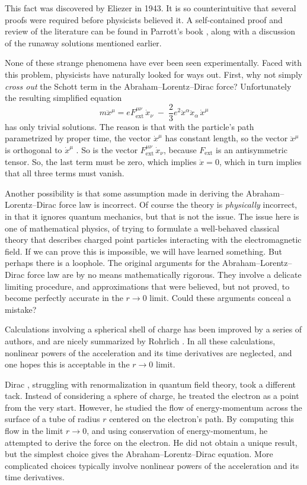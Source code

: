 \documentclass{article}
\newcommand{\ext}{\mathrm{ext}}
\begin{document}
This fact was discovered by Eliezer \cite{Eliezer} in 1943.  It is so counterintuitive that several proofs were required before physicists believed it.  A self-contained proof and review of the literature can be found in Parrott's book \cite{Parrott}, along with a discussion of the runaway solutions mentioned earlier.

None of these strange phenomena have ever been seen experimentally.  Faced with this
problem, physicists have naturally looked for ways out.   First, why not simply \emph{cross out} the Schott term in the Abraham--Lorentz--Dirac 
force?  Unfortunately the resulting simplified equation
\[    m \ddot{x}^\mu = e F_{\ext}^{\mu \nu} \, \dot{x}_\nu   \;- \;
\frac{2}{3}e^2 \ddot{x}^\alpha \ddot{x}_\alpha \, \dot{x}^\mu \]
has only trivial solutions.  The reason is that with the particle's path parametrized by 
proper time, the vector $\dot{x}^\mu$ has constant length, so the vector $\ddot{x}^\mu$ is orthogonal to $\dot{x}^\mu$ .  So is the vector 
$F_{\ext}^{\mu \nu} \, \dot{x}_\nu$, because $F_{\ext}$ is an antisymmetric
tensor.  So, the last term must be zero, which implies $\ddot{x} = 0$, 
which in turn implies that all three terms must vanish.
 
Another possibility is that some assumption made in deriving the Abraham--Lorentz--Dirac force law is incorrect.  Of course the theory is \emph{physically} incorrect, in that it ignores quantum mechanics, but that is not the issue.  The issue here is one of mathematical physics, of trying to formulate a well-behaved classical theory that describes charged point particles interacting with the electromagnetic field.  If we can prove this is impossible, we will have learned something.  But perhaps there is a loophole. The original arguments for the Abraham--Lorentz--Dirac force law are by no means mathematically rigorous.  They involve a delicate limiting procedure, and 
approximations that were believed, but not proved, to become perfectly accurate 
in the $r \to 0$ limit.  Could these arguments conceal a mistake?  

Calculations involving a spherical shell of charge has been improved by a series of 
authors, and are nicely summarized by Rohrlich \cite{Rohrlich1997,Rohrlich1999}. 
In all these calculations, nonlinear powers of the acceleration and its time derivatives
are neglected, and one hopes this is acceptable in the $r \to 0$ limit.   

Dirac \cite{Dirac}, struggling with renormalization in quantum field theory, took a
different tack.  Instead of considering a sphere of charge, he treated the 
electron as a point from the very start.  However, he studied the flow of energy-momentum across the surface of a tube of radius $r$ centered on the electron's path.
By computing this flow in the limit $r \to 0$, and using conservation of energy-momentum, he attempted to derive the force on the electron.  He did not obtain a 
unique result, but the simplest choice gives the Abraham--Lorentz--Dirac equation.  
More complicated choices typically involve nonlinear powers of the acceleration and its time derivatives.
\end{document}
